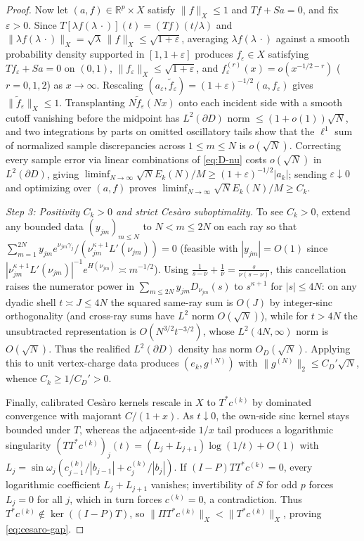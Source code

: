 \documentclass[11pt,reqno]{amsart}
\theoremstyle{definition}
\theoremstyle{remark}
\newcommand{\R}{\mathbb{R}}
\begin{document}
\begin{proof}
Now let $(a, f) \in \R^p \times X$ satisfy $\|f\|_X \le 1$ and $T f + S a = 0$, and fix $\varepsilon > 0$. Since $T[\lambda f(\lambda\,\cdot)](t) = (T f)(t/\lambda)$ and $\|\lambda f(\lambda\,\cdot)\|_X = \sqrt{\lambda}\,\|f\|_X \le \sqrt{1+\varepsilon}$, averaging $\lambda f(\lambda\,\cdot)$ against a smooth probability density supported in $[1, 1+\varepsilon]$ produces $f_\varepsilon \in X$ satisfying $T f_\varepsilon + S a = 0$ on $(0,1)$, $\|f_\varepsilon\|_X \le \sqrt{1+\varepsilon}$, and $f_\varepsilon^{(r)}(x) = o(x^{-1/2 - r})$ ($r = 0, 1, 2$) as $x \to \infty$. Rescaling $(a_\varepsilon, \widetilde f_\varepsilon) = (1+\varepsilon)^{-1/2}(a, f_\varepsilon)$ gives $\|\widetilde f_\varepsilon\|_X \le 1$. Transplanting $N \widetilde f_\varepsilon(N x)$ onto each incident side with a smooth cutoff vanishing before the midpoint has $L^2(\partial D)$ norm $\le (1 + o(1))\sqrt{N}$, and two integrations by parts on omitted oscillatory tails show that the $\ell^1$ sum of normalized sample discrepancies across $1 \le m \le N$ is $o(\sqrt{N})$. Correcting every sample error via linear combinations of \eqref{eq:D-nu} costs $o(\sqrt{N})$ in $L^2(\partial D)$, giving $\liminf_{N\to\infty}\sqrt{N}E_k(N)/M \ge (1+\varepsilon)^{-1/2}|a_k|$; sending $\varepsilon \downarrow 0$ and optimizing over $(a, f)$ proves $\liminf_{N\to\infty}\sqrt{N}E_k(N)/M \ge C_k$.

\emph{Step 3: Positivity $C_k > 0$ and strict Ces\`aro suboptimality.} To see $C_k > 0$, extend any bounded data $(y_{jm})_{m\le N}$ to $N < m \le 2N$ on each ray so that $\sum_{m=1}^{2N} y_{jm} e^{\nu_{jm}\gamma_j} / (\nu_{jm}^{\kappa+1} L'(\nu_{jm})) = 0$ (feasible with $|y_{jm}| = O(1)$ since $|\nu_{jm}^{\kappa+1} L'(\nu_{jm})|^{-1} e^{H(\nu_{jm})} \asymp m^{-1/2}$). Using $\frac{1}{s-\nu} + \frac{1}{\nu} = \frac{s}{\nu(s-\nu)}$, this cancellation raises the numerator power in $\sum_{m\le 2N} y_{jm} D_{\nu_{jm}}(s)$ to $s^{\kappa+1}$ for $|s| \le 4N$: on any dyadic shell $t \asymp J \le 4N$ the squared same-ray sum is $O(J)$ by integer-sinc orthogonality (and cross-ray sums have $L^2$ norm $O(\sqrt N)$), while for $t > 4N$ the unsubtracted representation is $O(N^{3/2} t^{-3/2})$, whose $L^2(4N,\infty)$ norm is $O(\sqrt N)$. Thus the realified $L^2(\partial D)$ density has norm $O_D(\sqrt{N})$. Applying this to unit vertex-charge data produces $(e_k, g^{(N)})$ with $\|g^{(N)}\|_2 \le C_D' \sqrt{N}$, whence $C_k \ge 1/C_D' > 0$.

Finally, calibrated Ces\`aro kernels rescale in $X$ to $T^* c^{(k)}$ by dominated convergence with majorant $C/(1+x)$. As $t \downarrow 0$, the own-side sinc kernel stays bounded under $T$, whereas the adjacent-side $1/x$ tail produces a logarithmic singularity $(T T^* c^{(k)})_j(t) = (L_j + L_{j+1})\log(1/t) + O(1)$ with $L_j = \sin\omega_j(c_{j-1}^{(k)}/|b_{j-1}| + c_j^{(k)}/|b_j|)$. If $(I - P) T T^* c^{(k)} = 0$, every logarithmic coefficient $L_j + L_{j+1}$ vanishes; invertibility of $S$ for odd $p$ forces $L_j = 0$ for all $j$, which in turn forces $c^{(k)} = 0$, a contradiction. Thus $T^* c^{(k)} \notin \ker((I-P)T)$, so $\|\Pi T^* c^{(k)}\|_X < \|T^* c^{(k)}\|_X$, proving \eqref{eq:cesaro-gap}.
\end{proof}
\end{document}
